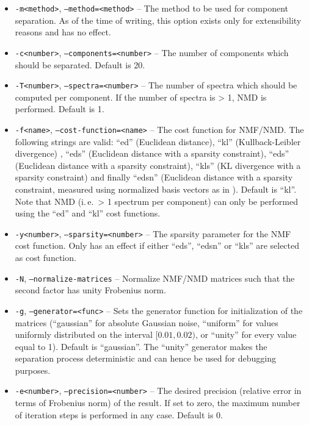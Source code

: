 \begin{itemize}
  \item {\tt -m<method>}, {\tt --method=<method>} -- The method to be used
    for component separation. As of the time of writing, this option exists
    only for extensibility reasons and has no effect.
  \item {\tt -c<number>}, {\tt --components=<number>} -- The number of
    components which should be separated. Default is 20.
  \item {\tt -T<number>}, {\tt --spectra=<number>} -- The number of spectra
    which should be computed per component. If the number of spectra is > 1,
    NMD is performed. Default is 1.
  \item {\tt -f<name>}, {\tt --cost-function=<name>} -- The cost function for
    NMF/NMD. The following strings are valid: ``ed'' (Euclidean distance),
    ``kl'' (Kullback-Leibler divergence) \cite{LeeSeung2001}, ``eds'' (Euclidean distance with a 
    sparsity constraint), ``eds'' (Euclidean distance with a sparsity constraint),
    ``kls'' (KL divergence with a sparsity constraint) \cite{Virtanen2007} and finally ``edsn'' 
    (Euclidean distance with a sparsity constraint, measured using normalized
    basis vectors as in \cite{Eggert2004}). Default is ``kl''. Note that NMD
    (i.\,e.\ > 1 spectrum per component) can only be performed using the ``ed''
    and ``kl'' cost functions.
  \item {\tt -y<number>}, {\tt --sparsity=<number>} -- The sparsity parameter
    for the NMF cost function. Only has an effect if either ``eds'', ``edsn''
    or ``kls'' are selected as cost function.
  \item {\tt -N}, {\tt --normalize-matrices} -- Normalize NMF/NMD matrices such
    that the second factor has unity Frobenius norm.
  \item {\tt -g}, {\tt --generator=<func>} -- Sets the generator function for
    initialization of the matrices (``gaussian'' for absolute Gaussian noise, 
    ``uniform'' for values uniformly distributed on the interval $[0.01,0.02)$,
    or ``unity'' for every value equal to 1). Default is ``gaussian''.
    The ``unity'' generator makes the separation process deterministic and can
    hence be used for debugging purposes.
  \item {\tt -e<number>}, {\tt --precision=<number>} -- The desired precision
    (relative error in terms of Frobenius norm) of the result. If set to zero,
    the maximum number of iteration steps is performed in any case. Default is
    0.

\end{itemize}
